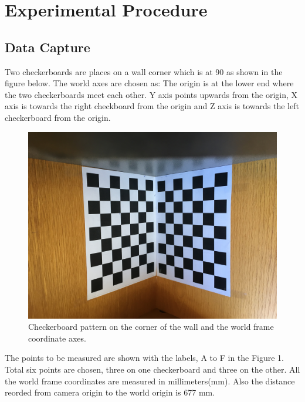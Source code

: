 \documentclass{article}
\begin{document}

\section{Experimental Procedure}
\subsection{Data Capture}
Two checkerboards are places on a wall corner which is at 90{\degree} as shown in the figure below. The world axes are chosen as: The origin is at the lower end where the two checkerboards meet each other. Y axis points upwards from the origin, X axis is towards the right checkboard from the origin and Z axis is towards the left checkerboard from the origin.
\medskip

\begin{figure}[h]
\begin{center}
\includegraphics[width=1\textwidth,angle=180]{check_1.jpg} %
\caption{Checkerboard pattern on the corner of the wall and the world frame coordinate axes.}
\end{center}
\end{figure}

The points to be measured are shown with the labels, A to F in the Figure 1. Total six points are chosen, three on one checkerboard and three on the other. All the world frame coordinates are measured in millimeters(mm). Also the distance reorded from camera origin to the world origin is 677 mm. 
\end{document}
